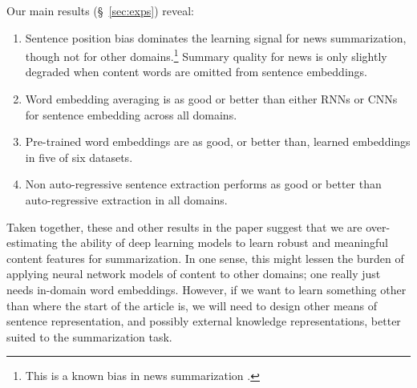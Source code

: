 \noindent
Our main results (\S~\ref{sec:exps}) reveal:
\begin{enumerate}[noitemsep]
\item Sentence position bias dominates the learning signal for news summarization, though not for
    other domains.\footnote{This is a known bias 
    in news summarization \cite{nenkova2005automatic}.}
Summary quality for news is only slightly degraded when content words
are omitted from sentence embeddings. %
\item Word embedding averaging is as good or better than either RNNs or CNNs for sentence embedding across all domains.
\item Pre-trained word embeddings are as good, or better than, learned embeddings in five of six datasets.%
\item Non auto-regressive sentence extraction performs as good or better 
     than auto-regressive extraction in all
    domains.
\end{enumerate} 

\noindent
Taken together, these and other results in the paper suggest that we are 
over-estimating the ability of deep learning models to learn robust and 
meaningful content features for summarization.  
In one sense, this might lessen the burden of applying neural network models
of  content to other domains; one really just needs in-domain word embeddings.
However, if we want to learn something other than where the start of 
the article is, we will need to design other means of sentence representation,
and possibly external knowledge representations, better suited to the summarization task.


